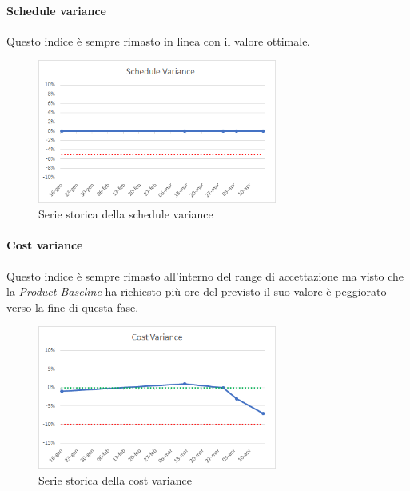 	\paragraph{Schedule variance} \Spazio
	Questo indice è sempre rimasto in linea con il valore ottimale.
	\begin{figure}[H]
		\centering 
		\includegraphics[width=0.7\textwidth]{Images/SV.png}
		\caption{Serie storica della schedule variance}
		\label{SV} 
	\end{figure}
    \paragraph{Cost variance} \Spazio
    Questo indice è sempre rimasto all'interno del range di accettazione ma visto che la \emph{Product Baseline} ha richiesto più ore del previsto il suo valore è peggiorato verso la fine di questa fase.
    \begin{figure}[H]
	\centering 
	\includegraphics[width=0.7\textwidth]{Images/CV.png}
	\caption{Serie storica della cost variance}
	\label{SV} 
    \end{figure}
